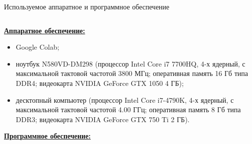 \documentclass[10pt]{beamer}
\begin{document}
        \begin{frame}{Используемое аппаратное и программное обеспечение}
            \footnotesize
            \begin{columns}[T]
                \begin{column}[T]{0.5\textwidth}
                    \vspace{0pt}
                    \textbf{\underline{Аппаратное обеспечение:}}
                    \begin{itemize}
                        \item Google Colab;
                        \item ноутбук N580VD-DM298 (процессор Intel Core i7 7700HQ, 4-х ядерный, с максимальной тактовой частотой 3800 МГц; оперативная память 16 Гб типа DDR4; видеокарта NVIDIA GeForce GTX 1050 4 ГБ);
                        \item десктопный компьютер (процессор Intel Core i7-4790K, 4-х ядерный, с максимальной тактовой частотой 4.00 ГГц; оперативная память 8 Гб типа DDR3; видеокарта NVIDIA GeForce GTX 750 Ti 2 ГБ).
                    \end{itemize}
                    \textbf{\underline{Программное обеспечение:}}
                    \begin{itemize}

\end{itemize}
\end{column}
\end{columns}
\end{frame}
\end{document}
